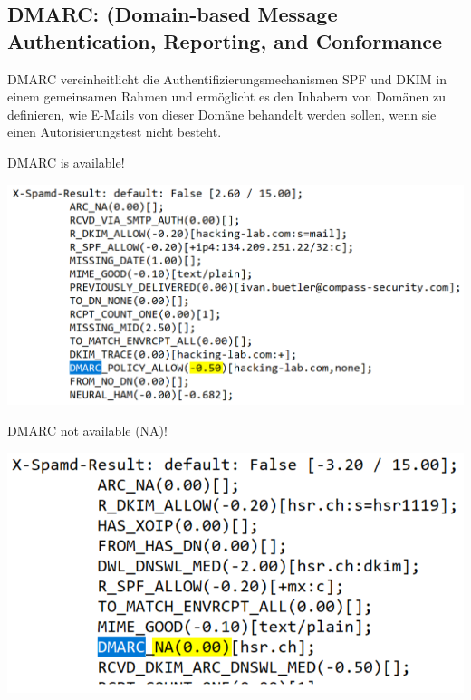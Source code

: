 \subsection{DMARC: (Domain-based Message Authentication, Reporting, and Conformance}
DMARC vereinheitlicht die Authentifizierungsmechanismen SPF und DKIM in einem gemeinsamen Rahmen und ermöglicht es den Inhabern von Domänen zu definieren, wie E-Mails von dieser Domäne behandelt werden sollen, wenn sie einen Autorisierungstest nicht besteht.

DMARC is available!
\begin{center}
    \vspace{-8pt}
    \includegraphics[width=.8\linewidth]{./img/07-mail_security/dmarc}
    \vspace{-8pt}
\end{center}
DMARC not available (NA)!
\begin{center}
    \vspace{-8pt}
    \includegraphics[width=.6\linewidth]{./img/07-mail_security/dmarc2}
    \vspace{-8pt}
\end{center}


%
%

%
%
%


